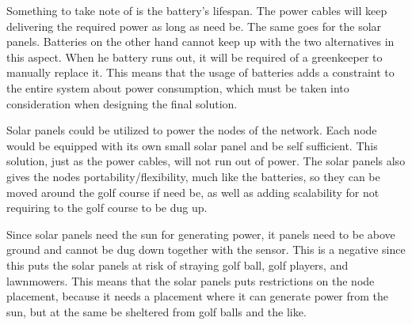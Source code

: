 Something to take note of is the battery's lifespan. 
The power cables will keep delivering the required power as long as need be. 
The same goes for the solar panels. 
Batteries on the other hand cannot keep up with the two alternatives in this aspect. 
When he battery runs out, it will be required of a greenkeeper to manually replace it. 
This means that the usage of batteries adds a constraint to the entire system about power consumption, which must be taken into consideration when designing the final solution.

Solar panels could be utilized to power the nodes of the network. 
Each node would be equipped with its own small solar panel and be self sufficient. 
This solution, just as the power cables, will not run out of power. 
The solar panels also gives the nodes portability/flexibility, much like the batteries, so they can be moved around the golf course if need be, as well as adding scalability for not requiring to the golf course to be dug up.

Since solar panels need the sun for generating power, it panels need to be above ground and cannot be dug down together with the sensor. 
This is a negative since this puts the solar panels at risk of straying golf ball, golf players, and lawnmowers. 
This means that the solar panels puts restrictions on the node placement, because it needs a placement where it can generate power from the sun, but at the same be sheltered from golf balls and the like.
